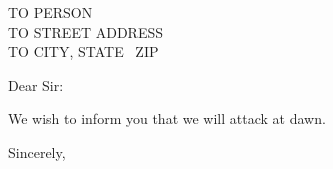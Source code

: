 \documentclass{letter}
\begin{document}

                             \address{
				     		  Scott Kruger\\
                             	        5621 Arapahoe Drive\\
                             	        Boulder, CO \ 80303} 
      
  \begin{letter}
      {TO PERSON \\
      TO STREET ADDRESS\\
      TO CITY, STATE \ ZIP}
      
      \opening{Dear Sir:}
      
                 We wish to inform you that we will attack at dawn.
      
      
      \signature{Scott Kruger\\
      	 Research Scientist}
      
      \closing{Sincerely,}
      
      
  \end{letter}
\end{document}
